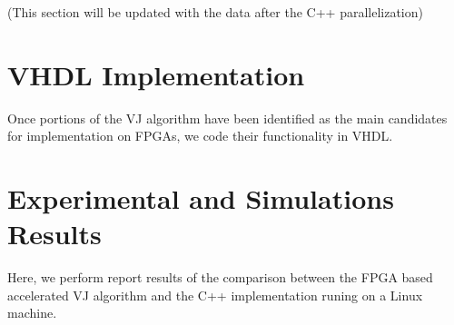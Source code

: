 \documentclass[conference]{IEEEtran}
\begin{document}
(This section will be updated with the data after the C++ parallelization)

\begin{table}[]
\begin{center}
\end{center}
\caption{Gprof analysis of C++ Sequential Implementation}
\label{my-label}
\end{table}


\section {VHDL Implementation}


Once portions of the VJ algorithm have been identified as the main candidates for implementation on FPGAs, we code their functionality in VHDL.




\section {Experimental and Simulations Results}
\label{results_section}


Here, we perform report results of the comparison between the FPGA based accelerated VJ algorithm and the C++ implementation runing on a Linux machine.
\end{document}
